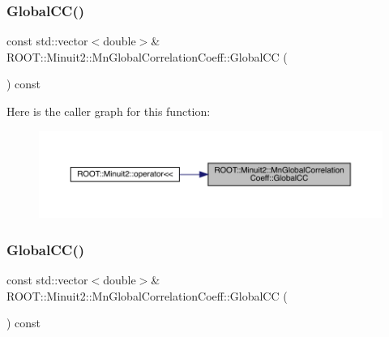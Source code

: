 \subsubsection{\texorpdfstring{GlobalCC()}{GlobalCC()}\hspace{0.1cm}{\footnotesize\ttfamily [1/2]}}
{\footnotesize\ttfamily const std\+::vector$<$double$>$\& R\+O\+O\+T\+::\+Minuit2\+::\+Mn\+Global\+Correlation\+Coeff\+::\+Global\+CC (\begin{DoxyParamCaption}{ }\end{DoxyParamCaption}) const\hspace{0.3cm}{\ttfamily [inline]}}

Here is the caller graph for this function\+:\nopagebreak
\begin{figure}[H]
\begin{center}
\leavevmode
\includegraphics[width=350pt]{da/d0d/classROOT_1_1Minuit2_1_1MnGlobalCorrelationCoeff_ab078e8b07600339fea0af842a8e2de00_icgraph}
\end{center}
\end{figure}
\mbox{\label{classROOT_1_1Minuit2_1_1MnGlobalCorrelationCoeff_ab078e8b07600339fea0af842a8e2de00}} 
\subsubsection{\texorpdfstring{GlobalCC()}{GlobalCC()}\hspace{0.1cm}{\footnotesize\ttfamily [2/2]}}
{\footnotesize\ttfamily const std\+::vector$<$double$>$\& R\+O\+O\+T\+::\+Minuit2\+::\+Mn\+Global\+Correlation\+Coeff\+::\+Global\+CC (\begin{DoxyParamCaption}{ }\end{DoxyParamCaption}) const\hspace{0.3cm}{\ttfamily [inline]}}

\mbox{\label{classROOT_1_1Minuit2_1_1MnGlobalCorrelationCoeff_a1fe4d8b557ebda40e092ed3b7032fc44}} 
